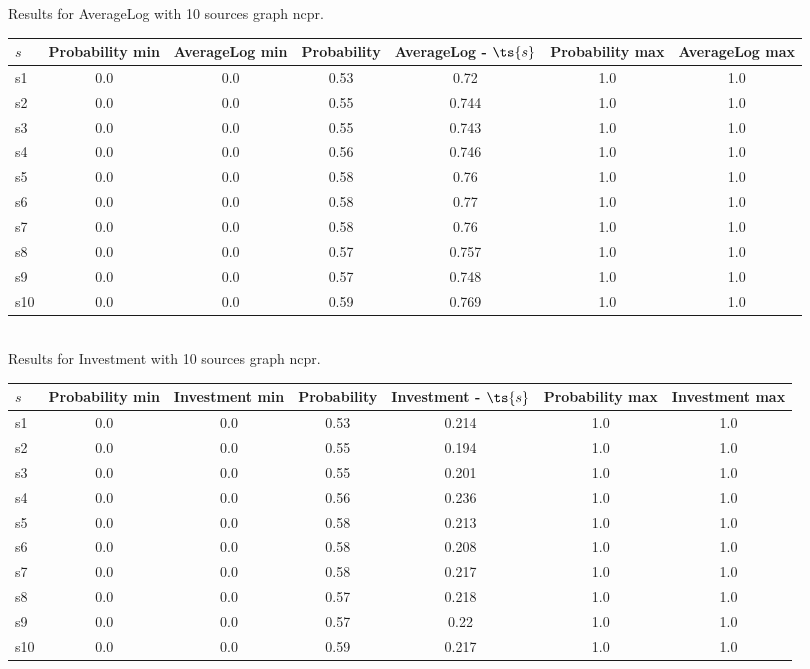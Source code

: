 \documentclass{article}
\begin{document}
\noindent Results for AverageLog with 10 sources graph ncpr.

\noindent\begin{tabular}{|l|c|c|c|c|c|c|}
\hline
$s$& Probability min & AverageLog min & Probability & AverageLog - $\ts{s}$ & Probability max & AverageLog max\\
\hline
s1 &0.0 & 0.0 & 0.53 & 0.72 & 1.0 & 1.0\\
\hline
s2 &0.0 & 0.0 & 0.55 & 0.744 & 1.0 & 1.0\\
\hline
s3 &0.0 & 0.0 & 0.55 & 0.743 & 1.0 & 1.0\\
\hline
s4 &0.0 & 0.0 & 0.56 & 0.746 & 1.0 & 1.0\\
\hline
s5 &0.0 & 0.0 & 0.58 & 0.76 & 1.0 & 1.0\\
\hline
s6 &0.0 & 0.0 & 0.58 & 0.77 & 1.0 & 1.0\\
\hline
s7 &0.0 & 0.0 & 0.58 & 0.76 & 1.0 & 1.0\\
\hline
s8 &0.0 & 0.0 & 0.57 & 0.757 & 1.0 & 1.0\\
\hline
s9 &0.0 & 0.0 & 0.57 & 0.748 & 1.0 & 1.0\\
\hline
s10 &0.0 & 0.0 & 0.59 & 0.769 & 1.0 & 1.0\\
\hline
\end{tabular}\\

\noindent Results for Investment with 10 sources graph ncpr.

\noindent\begin{tabular}{|l|c|c|c|c|c|c|}
\hline
$s$& Probability min & Investment min & Probability & Investment - $\ts{s}$ & Probability max & Investment max\\
\hline
s1 &0.0 & 0.0 & 0.53 & 0.214 & 1.0 & 1.0\\
\hline
s2 &0.0 & 0.0 & 0.55 & 0.194 & 1.0 & 1.0\\
\hline
s3 &0.0 & 0.0 & 0.55 & 0.201 & 1.0 & 1.0\\
\hline
s4 &0.0 & 0.0 & 0.56 & 0.236 & 1.0 & 1.0\\
\hline
s5 &0.0 & 0.0 & 0.58 & 0.213 & 1.0 & 1.0\\
\hline
s6 &0.0 & 0.0 & 0.58 & 0.208 & 1.0 & 1.0\\
\hline
s7 &0.0 & 0.0 & 0.58 & 0.217 & 1.0 & 1.0\\
\hline
s8 &0.0 & 0.0 & 0.57 & 0.218 & 1.0 & 1.0\\
\hline
s9 &0.0 & 0.0 & 0.57 & 0.22 & 1.0 & 1.0\\
\hline
s10 &0.0 & 0.0 & 0.59 & 0.217 & 1.0 & 1.0\\
\hline
\end{tabular}\\
\end{document}
